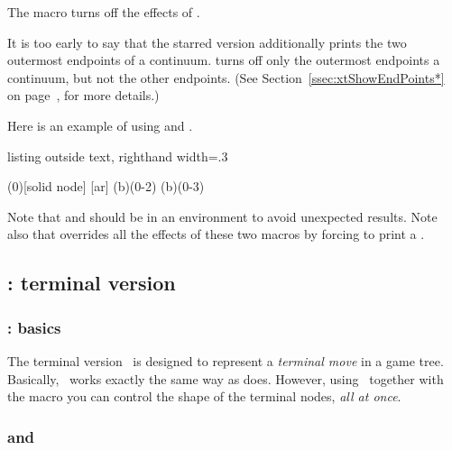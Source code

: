 The macro \icmd{\xtHideEndPoints} turns off the effects of \cmd{\xtShowEndPoints}.

It is too early to say that the starred version \icmd{\xtShowEndPoints*} additionally prints the two outermost endpoints of a continuum. 
\cmd{\xtHideEndPoints*} turns off only the outermost endpoints a continuum, but not the other endpoints. (See Section~\ref{ssec:xtShowEndPoints*} on page~\pageref{ssec:xtShowEndPoints*}, for more details.)

Here is an example of using \cmd{\xtShowEndPoints} and \cmd{\xtHideEndPoints}.

\begin{tcblisting}{listing outside text, righthand width=.3\linewidth}
\begin{istgame}
\xtShowEndPoints[oval node,minimum size=6pt]
\istroot(0)[solid node]
  \istb
  [ar]
  \endist
\xtShowEndPoints %
\xtdistance{15mm}{10mm}
\istroot(b)(0-2) \istb  \istb  \endist
\xtHideEndPoints %
\istroot(b)(0-3) \istb  \istb*  \endist
\end{istgame}
\end{tcblisting}

Note that \cmd{\xtShowEndPoints} and \cmd{\xtHideEndPoints} should be in an  environment to avoid unexpected results. 
Note also that \cmd{\istb*} overrides all the effects of these two macros by forcing to print a .


\subsection{\protect\cmd{\istbt}: terminal version}
\label{ssec:istbperiod}

\subsubsection{\protect\cmd{\istbt}: basics}

The terminal version \icmd{\istbt}\ is designed to represent a \emph{terminal move} in a game tree.
Basically, \cmd{\istbt}\ works exactly the same way as \cmd{\istb} does. 
However, using \cmd{\istbt}\ together with the macro \cmd{\xtShowTerminalNodes} you can control the shape of the terminal nodes, \emph{all at once}.

\subsubsection{\protect\cmd{\xtShowTerminalNodes} and \protect\cmd{\xtHideTerminalNodes}}
\label{page:terminalnode}

